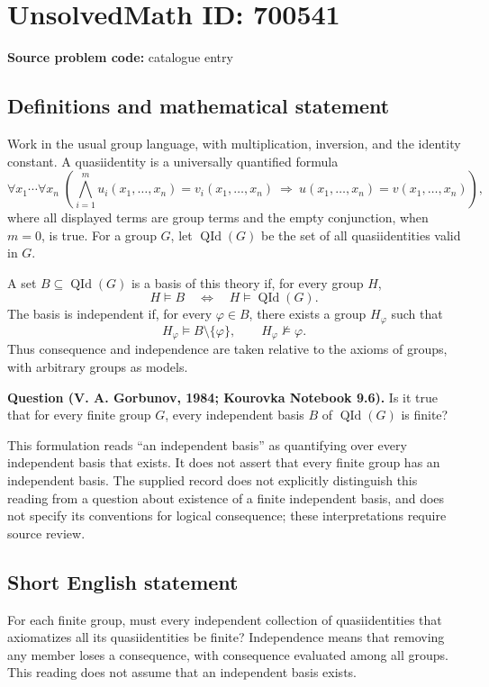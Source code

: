 \documentclass[11pt]{article}
\begin{document}
\section*{UnsolvedMath ID: 700541}
\textbf{Source problem code:} catalogue entry
\subsection{Definitions and mathematical statement}
Work in the usual group language, with multiplication, inversion, and the identity constant. A quasiidentity is a universally quantified formula
\[
\forall x_1\cdots\forall x_n\;\left(\bigwedge_{i=1}^{m}u_i(x_1,\ldots,x_n)=v_i(x_1,\ldots,x_n)\ \Longrightarrow\ u(x_1,\ldots,x_n)=v(x_1,\ldots,x_n)\right),
\]
where all displayed terms are group terms and the empty conjunction, when \(m=0\), is true. For a group \(G\), let \(\operatorname{QId}(G)\) be the set of all quasiidentities valid in \(G\).

A set \(B\subseteq\operatorname{QId}(G)\) is a basis of this theory if, for every group \(H\),
\[
H\models B\quad\Longleftrightarrow\quad H\models\operatorname{QId}(G).
\]
The basis is independent if, for every \(\varphi\in B\), there exists a group \(H_\varphi\) such that
\[
H_\varphi\models B\setminus\{\varphi\},\qquad H_\varphi\not\models\varphi.
\]
Thus consequence and independence are taken relative to the axioms of groups, with arbitrary groups as models.

\textbf{Question (V. A. Gorbunov, 1984; Kourovka Notebook 9.6).} Is it true that for every finite group \(G\), every independent basis \(B\) of \(\operatorname{QId}(G)\) is finite?

This formulation reads ``an independent basis'' as quantifying over every independent basis that exists. It does not assert that every finite group has an independent basis. The supplied record does not explicitly distinguish this reading from a question about existence of a finite independent basis, and does not specify its conventions for logical consequence; these interpretations require source review.
\subsection{Short English statement}
For each finite group, must every independent collection of quasiidentities that axiomatizes all its quasiidentities be finite? Independence means that removing any member loses a consequence, with consequence evaluated among all groups. This reading does not assume that an independent basis exists.
\end{document}
